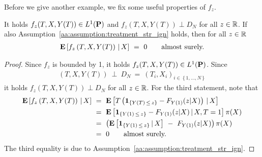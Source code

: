 Before we give another example, we fix some useful properties of $f_z$.
\begin{lemma}
    \label{lem:f_z}
    It holds
    $f_z(T,X,Y(T))\in L^1(\P)$
    and 
    $f_z(T,X,Y(T))\perp D_N$
    for all $z\in\R$.
    If also Assumption~\ref{aa:assumption:treatment_str_ign} holds,
    then 
    for all $z\in\R$
    \begin{gather*}
      \E
      \left[
        f_z
        \left( 
          T,
          X,
          Y(T)
        \right)
        \,
        |
        \,
        X
      \right]
      \ 
      =
      \ 
      0
      \qquad
      \text{almost surely.}
    \end{gather*}
  \end{lemma}
  \begin{proof}
    Since $f_z$ is bounded by 1,
    it holds
    $f_z(T,X,Y(T))\in L^1(\P)$.
    Since
    \begin{gather*}
    (T,X,Y(T))
    \ 
    \perp 
    \ 
    D_N
    \ 
    =
    \ 
    (T_i,X_i)_{i\in \left\{ 1,\ldots,N \right\}}
    \end{gather*}
    it holds
    $f_z(T,X,Y(T))\perp D_N$
    for all $z\in\R$.
    For the third statement, note that
    \begin{align*}
      \E
      \left[
        f_z
        \left( 
          T,
          X,
          Y(T)
        \right)
        \,
        |
        \,
        X
      \right]
      &
      \ 
      =
      \ 
      \E
      \left[
      T
      \left( 
        \mathbf{1}
        _{\left\{  Y(T)\,\le\,z \right\}}
        -
        F_{Y(1)}(z|X)
      \right)
        \,
        |
        \,
        X
      \right]
      \\
      &
      \ 
      =
      \ 
      \E
      \left[
        \mathbf{1}
        _{\left\{  Y(1)\,\le\,z \right\}}
        -
        F_{Y(1)}(z|X)
        \,
        |
        \,
        X
        ,
        T=1
      \right]
      \pi(X)
      \\
      &
      \ 
      =
      \ 
      \left( 
      \E
      \left[
        \mathbf{1}
        _{\left\{  Y(1)\,\le\,z \right\}}
        \,
        |
        \,
        X
      \right]
      \ 
        -
      \ 
        F_{Y(1)}(z|X)
      \right)
      \pi(X)
      \\
      &
      \ 
      =
      \ 
      0
      \qquad
      \text{almost surely.}
    \end{align*}
    The third equality is due to Assumption~\ref{aa:assumption:treatment_str_ign}.
  \end{proof}

